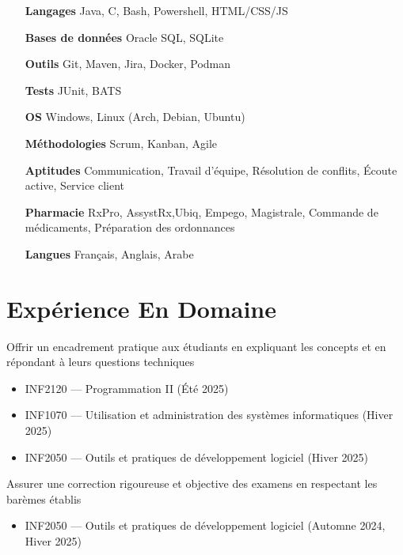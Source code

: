 \documentclass[letterpaper,10pt]{article}
\begin{document}
  \begin{multicols}{2}
    \begin{itemize}[itemsep=-2px, parsep=5pt, leftmargin=75pt]
      \item[\textbf{Langages}] Java, C, Bash, Powershell, HTML/CSS/JS
      \item[\textbf{Bases de données}] Oracle SQL, SQLite
      \item[\textbf{Outils}] Git, Maven, Jira, Docker, Podman
      \item[\textbf{Tests}] JUnit, BATS
      \item[\textbf{OS}]  Windows, Linux (Arch, Debian, Ubuntu)
      \item[\textbf{Méthodologies}]  Scrum, Kanban, Agile
      \item[\textbf{Aptitudes}]  Communication, Travail d'équipe, Résolution de conflits, Écoute active, Service client
      \item[\textbf{Pharmacie}]  RxPro, AssystRx,Ubiq, Empego, Magistrale, Commande de médicaments, Préparation des ordonnances
      \item[\textbf{Langues}]  Français, Anglais, Arabe
    \end{itemize}
  \end{multicols}


  \section{Expérience En Domaine}

  \begin{resume_list}
    \item Offrir un encadrement pratique aux étudiants en expliquant les concepts et en répondant à leurs questions techniques
    \begin{itemize}
        \item INF2120 — Programmation II (Été 2025)
        \item INF1070 — Utilisation et administration des systèmes informatiques (Hiver 2025)
        \item INF2050 — Outils et pratiques de développement logiciel (Hiver 2025)
    \end{itemize}
  \vspace{3pt}
  
    \item Assurer une correction rigoureuse et objective des examens en respectant les barèmes établis
    \begin{itemize}
        \item INF2050 — Outils et pratiques de développement logiciel (Automne 2024, Hiver 2025)
    \end{itemize}
  \end{resume_list}
\end{document}
